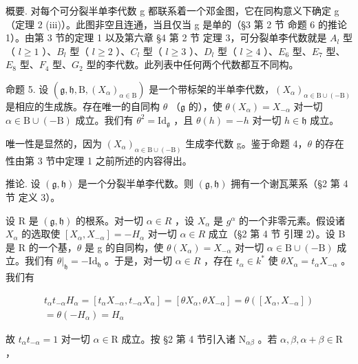 概要. 对每个可分裂半单李代数 g 都联系着一个邓金图，它在同构意义下确定 g （定理 2 (iii)）。此图非空且连通，当且仅当 g 是单的（§3 第 2 节 命题 6 的推论 1）。由第 3 节的定理 1 以及第六章 §4 第 2 节 定理 3，可分裂单李代数就是 \(A_{l}\) 型（ \(l \geq 1\) ）、\(B_{l}\) 型（ \(l \geq 2\) ）、\(C_{l}\) 型（ \(l \geq 3\) ）、\(D_{l}\) 型（ \(l \geq 4\) ）、\(E_{6}\) 型、\(E_{7}\) 型、\(E_{8}\) 型、\(F_{4}\) 型、\(G_{2}\) 型的李代数。此列表中任何两个代数都互不同构。

命题 5. 设 \((\mathfrak{g},\mathfrak{h},\mathrm{B},(X_{\alpha})_{\alpha \in \mathrm{B}})\) 是一个带标架的半单李代数，\((X_{\alpha})_{\alpha \in \mathrm{B}\cup (-\mathrm{B})}\) 是相应的生成族。存在唯一的自同构 \(\theta\) （\(\mathfrak{g}\) 的），使 \(\theta (X_{\alpha}) = X_{-\alpha}\) 对一切 \(\alpha \in \mathrm{B}\cup (-\mathrm{B})\) 成立。我们有 \(\theta^2 = \mathrm{Id}_{\mathfrak{g}}\) ，且 \(\theta (h) = -h\) 对一切 \(h\in \mathfrak{h}\) 成立。

唯一性是显然的，因为 \((X_{\alpha})_{\alpha\in\mathrm{B}\cup(-\mathrm{B})}\) 生成李代数 g。鉴于命题 4，\(\theta\) 的存在性由第 3 节中定理 1 之前所述的内容得出。

推论. 设 \((\mathfrak{g},\mathfrak{h})\) 是一个分裂半单李代数。则 \((\mathfrak{g},\mathfrak{h})\) 拥有一个谢瓦莱系（§2 第 4 节 定义 3）。

设 R 是 \((\mathfrak{g},\mathfrak{h})\) 的根系。对一切 \(\alpha\in R\) ，设 \(X_{\alpha}\) 是 \(g^{\alpha}\) 的一个非零元素。假设诸 \(X_{\alpha}\) 的选取使 \([X_{\alpha},X_{-\alpha}]=-H_{\alpha}\) 对一切 \(\alpha\in R\) 成立（§2 第 4 节 引理 2）。设 B 是 R 的一个基，\(\theta\) 是 g 的自同构，使 \(\theta(X_{\alpha})=X_{-\alpha}\) 对一切 \(\alpha\in\mathrm{B}\cup(-\mathrm{B})\) 成立。我们有 \(\theta|_{\mathfrak{h}}=-\mathrm{Id}_{\mathfrak{h}}\) 。于是，对一切 \(\alpha\in R\) ，存在 \(t_{\alpha}\in k^{*}\) 使 \(\theta X_{\alpha}=t_{\alpha}X_{-\alpha}\) 。我们有

\[
\begin{array}{c} t _ {\alpha} t _ {- \alpha} H _ {\alpha} = [ t _ {\alpha} X _ {- \alpha}, t _ {- \alpha} X _ {\alpha} ] = [ \theta X _ {\alpha}, \theta X _ {- \alpha} ] = \theta ([ X _ {\alpha}, X _ {- \alpha} ]) \\ = \theta (- H _ {\alpha}) = H _ {\alpha} \end{array}
\]

故 \(t_{\alpha}t_{-\alpha} = 1\) 对一切 \(\alpha \in \mathrm{R}\) 成立。按 §2 第 4 节引入诸 \(\mathrm{N}_{\alpha \beta}\) 。若 \(\alpha, \beta, \alpha + \beta \in \mathrm{R}\) ，

